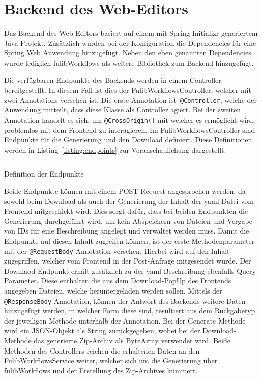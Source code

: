 \section{Backend des Web-Editors}\label{sec:editor-backend}
Das Backend des Web-Editors basiert auf einem mit Spring Initializr generiertem Java Projekt.
Zusätzlich wurden bei der Konfiguration die Dependencies für eine Spring Web Anwendung hinzugefügt.
Neben den eben genannten Dependencies wurde lediglich fulibWorkflows als weitere Bibliothek zum Backend hinzugefügt.

Die verfügbaren Endpunkte des Backends werden in einem Controller bereitgestellt.
In diesem Fall ist dies der FulibWorkflowsController, welcher mit zwei Annotations versehen ist.
Die erste Annotation ist~\texttt{@Controller}, welche der Anwendung mitteilt, dass diese Klasse als Controller agiert.
Bei der zweiten Annotation handelt es sich, um \texttt{@CrossOrigin()} mit welcher es ermöglicht wird, problemlos mit dem
Frontend zu interagieren.
Im FulibWorkflowsController sind Endpunkte für die Generierung und den Download definiert.
Diese Definitionen werden in Listing~\ref{listing:endpoints} zur Veranschaulichung dargestellt.

\begin{listing}[!ht]
    \inputminted[firstnumber=15]{java}{listings/3.3/Endpoints.java}
    \caption{Definition der Endpunkte}
    \label{listing:endpoints}
\end{listing}

Beide Endpunkte können mit einem POST-Request angesprochen werden, da sowohl beim Download als auch der Generierung der Inhalt der
yaml Datei vom Frontend mitgeschickt wird.
Dies sorgt dafür, dass bei beiden Endpunkten die Generierung durchgeführt wird, um kein Abspeichern von Dateien und Vergabe von IDs für
eine Beschreibung angelegt und verwaltet werden muss.
Damit die Endpunkte auf diesen Inhalt zugreifen können, ist der erste Methodenparameter mit der \texttt{@RequestBody} Annotation versehen.
Hierbei wird auf den Inhalt zugegriffen, welcher vom Frontend in der Post-Anfrage mitgesendet wurde.
Der Downlaod-Endpunkt erhält zusätzlich zu der yaml Beschreibung ebenfalls Query-Parameter.
Diese enthalten die aus dem Download-PopUp des Frontends angegeben Dateien, welche heruntergeladen werden sollen.
Mittels der \texttt{@ResponseBody} Annotation, können der Antwort des Backends weitere Daten hinzugefügt werden, in welcher Form diese
sind, resultiert aus dem Rückgabetyp der jeweiligen Methode unterhalb der Annotation.
Bei der Generate-Methode wird ein JSON-Objekt als String zurückgegeben, wobei bei der Download-Methode das generierte Zip-Archiv als ByteArray verwendet wird.
Beide Methoden des Controllers reichen die erhaltenen Daten an den FulibWorkflowsService weiter, welcher sich um die Generierung über fulibWorkflows
und der Erstellung des Zip-Archives kümmert.

